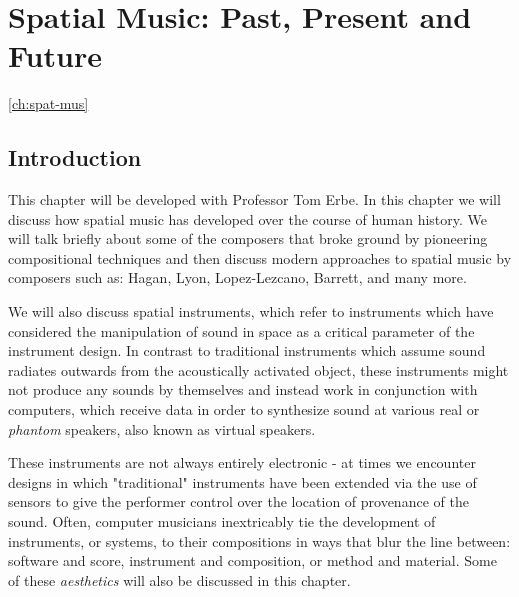 \chapter{Spatial Music: Past, Present and Future}
\ref{ch:spat-mus} 



\section{Introduction}

This chapter will be developed with Professor Tom Erbe. In this chapter we will discuss how spatial music has developed over the course of human history. We will talk briefly about some of the composers that broke ground by pioneering compositional techniques and then discuss modern approaches to spatial music by composers such as: Hagan, Lyon, Lopez-Lezcano, Barrett, and many more. 

We will also discuss spatial instruments, which refer to instruments which have considered the manipulation of sound in space as a critical parameter of the instrument design. In contrast to traditional instruments which assume sound radiates outwards from the acoustically activated object, these instruments might not produce any sounds by themselves and instead work in conjunction with computers, which receive data in order to synthesize sound at various real or \textit{phantom} speakers, also known as virtual speakers. 

These instruments are not always entirely electronic - at times we encounter designs in which "traditional" instruments have been extended via the use of sensors to give the performer control over the location of provenance of the sound. Often, computer musicians inextricably tie the development of instruments, or systems, to their compositions in ways that blur the line between: software and score, instrument and composition, or method and material. Some of these \textit{aesthetics} will also be discussed in this chapter. 

